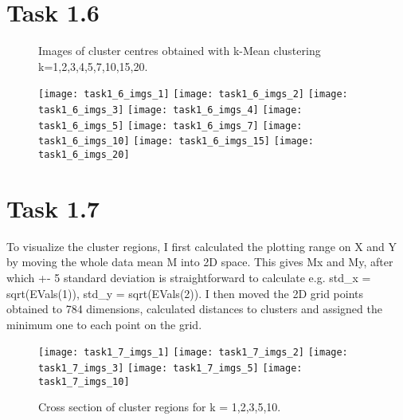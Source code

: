 \documentclass[12pt]{extarticle}
\begin{document}
\section{Task 1.6}
\begin{figure}[h!]
\centering
\caption{Images of cluster centres obtained with k-Mean clustering k=1,2,3,4,5,7,10,15,20.}
\end{figure}
\begin{figure}[h!]
\centering
\texttt{[image: task1\_6\_imgs\_1]}
\texttt{[image: task1\_6\_imgs\_2]}
\texttt{[image: task1\_6\_imgs\_3]}
\texttt{[image: task1\_6\_imgs\_4]}
\texttt{[image: task1\_6\_imgs\_5]}
\texttt{[image: task1\_6\_imgs\_7]}
\texttt{[image: task1\_6\_imgs\_10]}
\texttt{[image: task1\_6\_imgs\_15]}
\texttt{[image: task1\_6\_imgs\_20]}
\end{figure}
\pagebreak

\section{Task 1.7}
To visualize the cluster regions, I first calculated the plotting range on X and Y by moving the whole data mean M into 2D space. This gives Mx and My, after which +- 5 standard deviation is straightforward to calculate e.g. std\_x = sqrt(EVals(1)), std\_y = sqrt(EVals(2)). I then moved the 2D grid points obtained to 784 dimensions, calculated distances to clusters and assigned the minimum one to each point on the grid.

\begin{figure}[h!]
\caption{Cross section of cluster regions for k = 1,2,3,5,10.}
\centering
\texttt{[image: task1\_7\_imgs\_1]}
\texttt{[image: task1\_7\_imgs\_2]}
\texttt{[image: task1\_7\_imgs\_3]}
\texttt{[image: task1\_7\_imgs\_5]}
\texttt{[image: task1\_7\_imgs\_10]}
\end{figure}
\pagebreak
\end{document}
